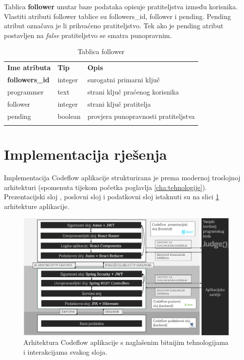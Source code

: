 \documentclass[times, utf8, zavrsni, numeric]{fer}
\begin{document}
		Tablica \textbf{follower} unutar baze podataka opisuje pratiteljstva između korisnika. Vlastiti atributi follower tablice su followers\_id, follower i pending. Pending atribut označava je li prihvaćeno pratiteljstvo. Tek ako je pending atribut postavljen na \textit{false} pratiteljstvo se smatra punopravnim.
		\begin{table}[H]
			\caption{Tablica follower}
			\label{tbl:follower}
			\centering
			\begin{tabu} to \textwidth {XXX}
				\tabucline[1.75pt]{-}
				\textbf{Ime atributa} & \textbf{Tip} & \textbf{Opis}\\ 				
				\tabucline[1.75pt]{-}
				\textbf{followers\_id} & integer & surogatni primarni ključ\\ \hline
				programmer & text & strani ključ praćenog korisnika\\ \hline
				follower & integer & strani ključ pratitelja\\ \hline
				pending & boolean & provjera punopravnosti pratiteljstva\\ \hline
				\tabucline[1.75pt]{-}
			\end{tabu}
		\end{table}
		
		\section{Implementacija rješenja}
		Implementacija Codeflow aplikacije strukturirana je prema modernoj troslojnoj arhitekturi (spomenuta tijekom početka poglavlja \ref{cha:tehnologije}). Prezentacijski sloj , poslovni sloj i podatkovni sloj   istaknuti su na slici \ref{fig:arh} arhitekture aplikacije.
		\begin{figure}[H]
			\centering
			\includegraphics[width=\linewidth]{pictures/prikazi/Arhitektura.png}
			\caption{Arhitektura Codeflow aplikacije s naglašenim bitnijim tehnologijama i interakcijama svakog sloja.}
			\label{fig:arh}
		\end{figure}
	
\end{document}
